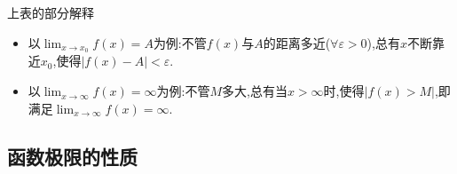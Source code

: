 \documentclass[12pt, a4paper, oneside, UTF8]{ctexbook}  %
\begin{document}
\begin{sloppypar}
\begin{center}
\begin{supertabular}{|c|c|c|c|c|}
        \end{supertabular}
    \end{center}
    \begin{criterion}{上表的部分解释}{}
        \begin{itemize}
            \item 以$\lim_{x \to x_0}f(x)=A$为例:不管$f(x)$与$A$的距离多近($\forall \varepsilon >0$),总有$x$不断靠近$x_0$,使得$|f(x)-A|<\varepsilon$.
            \item 以$\lim_{x\to \infty}f(x)=\infty$为例:不管$M$多大,总有当$x>\infty$时,使得$|f(x)>M|$,即满足$\lim_{x\to \infty}f(x)=\infty$.
        \end{itemize}
    \end{criterion}
    \subsection{函数极限的性质}

\end{sloppypar}
\end{document}
